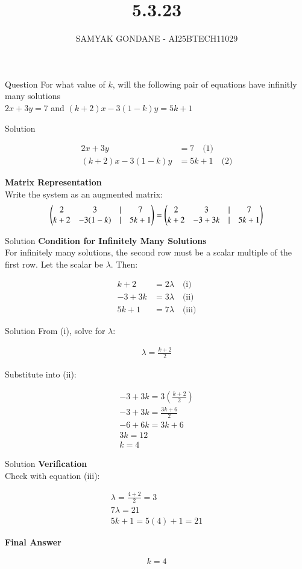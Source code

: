 \documentclass{beamer}
\title 
{5.3.23}
\date{}
\author
{SAMYAK GONDANE - AI25BTECH11029}
\begin{document}
\frame{\titlepage}

\begin{frame}{Question}
For what value of $k$, will the following pair of equations have infinitly many solutions\\

$2x + 3y = 7$ and $(k + 2)x - 3(1 - k)y = 5k + 1$
\end{frame}

\begin{frame}{Solution}

\begin{align}
2x + 3y &= 7 \quad \text{(1)} \\
(k + 2)x - 3(1 - k)y &= 5k + 1 \quad \text{(2)}
\end{align}

\textbf{Matrix Representation}\\
Write the system as an augmented matrix:
\begin{align}
\begin{pmatrix}
2 & 3 & \vert &7 \\
k+2 & -3(1-k) & \vert &5k + 1
\end{pmatrix} 
= 
\begin{pmatrix}
2 & 3 & \vert &7 \\
k+2 & -3 + 3k & \vert & 5k + 1
\end{pmatrix}
\end{align}
\end{frame}

\begin{frame}{Solution}
\textbf{Condition for Infinitely Many Solutions}\\
For infinitely many solutions, the second row must be a scalar multiple of the first row. Let the scalar be $\lambda$. Then:

\begin{align}
k + 2 &= 2\lambda \quad \text{(i)} \\
-3 + 3k &= 3\lambda \quad \text{(ii)} \\
5k + 1 &= 7\lambda \quad \text{(iii)}
\end{align}
\end{frame}

\begin{frame}{Solution}
From (i), solve for $\lambda$:

\begin{align}
\lambda = \frac{k + 2}{2}
\end{align}

Substitute into (ii):

\begin{align}
-3 + 3k = 3 (\frac{k + 2}{2})\\
-3 + 3k = \frac{3k + 6}{2}\\
-6 + 6k = 3k + 6\\
3k = 12\\
k = 4
\end{align}
\end{frame}

\begin{frame}{Solution}
\textbf{Verification}\\
Check with equation (iii):

\begin{align}
\lambda = \frac{4 + 2}{2} = 3 \\
7\lambda = 21 \\
5k + 1 = 5(4) + 1 = 21
\end{align}

\textbf{Final Answer}

\begin{align}
\boxed{k = 4}
\end{align}
\end{frame}
\end{document}
